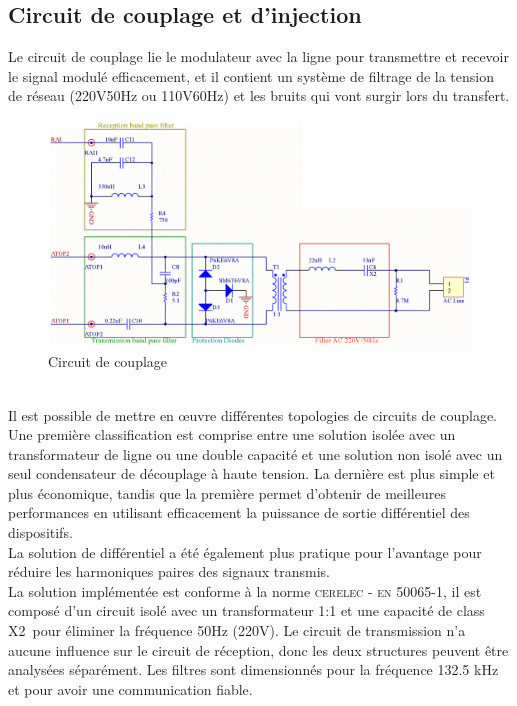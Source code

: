 \documentclass[11pt, a4paper, twoside]{book}
\begin{document}
\subsection{Circuit de couplage et d’injection}
Le circuit de couplage lie le modulateur avec la ligne pour transmettre et recevoir le signal modulé efficacement, et il contient un système de filtrage de la tension de réseau (220V\texttildelow 50Hz ou 110V\texttildelow 60Hz) et les bruits qui vont surgir lors du transfert.
\begin{figure}[h]
\centering
\includegraphics[width=\textwidth]{couplingCircuit}
\caption{Circuit de couplage}
\end{figure}
\\

Il est possible de mettre en œuvre différentes topologies de circuits de couplage. Une première classification est comprise entre une solution isolée avec un transformateur de ligne ou une double capacité et une solution non isolé avec un seul condensateur de découplage à haute tension. La dernière est plus simple et plus économique, tandis que la première permet d'obtenir de meilleures performances en utilisant efficacement la puissance de sortie différentiel des dispositifs.\\

La solution de différentiel a été également plus pratique pour l'avantage pour réduire les harmoniques paires des signaux transmis.\\

La solution implémentée est conforme à la norme \textsc{cerelec - en 50065-1}, il est composé d’un circuit isolé avec un transformateur 1:1 et une capacité de class X2\footnotemark \ pour éliminer la fréquence 50Hz (220V). Le circuit de transmission n'a aucune influence sur le circuit de réception, donc les deux structures peuvent être analysées séparément. Les filtres sont dimensionnés pour la fréquence 132.5 kHz et pour avoir une communication fiable.
\end{document}
